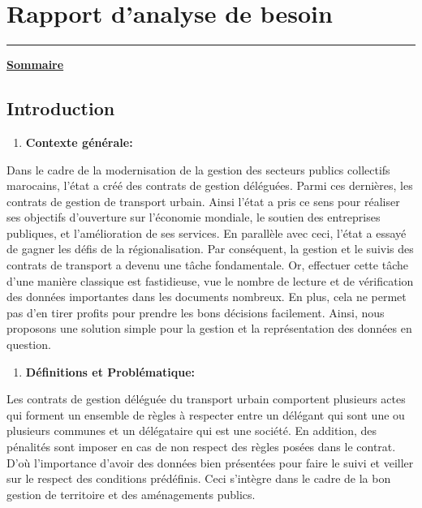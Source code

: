 \documentclass[
]{article}
\author{}
\date{}
\begin{document}
\hypertarget{rapport-danalyse-de-besoin}{%
\section{Rapport d'analyse de besoin}\label{rapport-danalyse-de-besoin}}

\begin{center}\rule{0.5\linewidth}{0.5pt}\end{center}

\underline{\textbf{Sommaire}}

\tableofcontents

\hypertarget{introduction}{%
\subsection{Introduction}\label{introduction}}

\begin{enumerate}
\def\labelenumi{\arabic{enumi}.}
\item
  \textbf{Contexte générale:}
\end{enumerate}

Dans le cadre de la modernisation de la gestion des secteurs publics
collectifs marocains, l'état a créé des contrats de gestion déléguées.
Parmi ces dernières, les contrats de gestion de transport urbain. Ainsi
l'état a pris ce sens pour réaliser ses objectifs d'ouverture sur
l'économie mondiale, le soutien des entreprises publiques, et
l'amélioration de ses services. En parallèle avec ceci, l'état a essayé
de gagner les défis de la régionalisation. Par conséquent, la gestion et
le suivis des contrats de transport a devenu une tâche fondamentale. Or,
effectuer cette tâche d'une manière classique est fastidieuse, vue le
nombre de lecture et de vérification des données importantes dans les
documents nombreux. En plus, cela ne permet pas d'en tirer profits pour
prendre les bons décisions facilement. Ainsi, nous proposons une
solution simple pour la gestion et la représentation des données en
question.

\begin{enumerate}
\def\labelenumi{\arabic{enumi}.}
\item
  \textbf{Définitions et Problématique:}
\end{enumerate}

Les contrats de gestion déléguée du transport urbain comportent
plusieurs actes qui forment un ensemble de règles à respecter entre un
délégant qui sont une ou plusieurs communes et un délégataire qui est
une société. En addition, des pénalités sont imposer en cas de non
respect des règles posées dans le contrat. D'où l'importance d'avoir des
données bien présentées pour faire le suivi et veiller sur le respect
des conditions prédéfinis. Ceci s'intègre dans le cadre de la bon
gestion de territoire et des aménagements publics.
\end{document}
